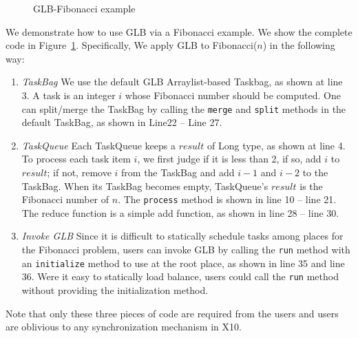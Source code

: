 \documentclass[twocolumn,DIV=20,letterpaper,9pt]{scrartcl}
\newcommand{\code}[1]{\texttt{\textup{#1}}}
\begin{document}
\begin{appendices}
\begin{figure}
  \centering
   \mbox{}
   \caption{GLB-Fibonacci example}
  \label{fig:design:fib}
\end{figure}
We demonstrate how to use GLB via a Fibonacci example. We show the complete code in Figure~\ref{fig:design:fib}. 
Specifically, We apply GLB to Fibonacci($n$) in the following way: 
\begin{enumerate}
\item \textit{TaskBag} We use the default GLB Arraylist-based Taskbag, as shown at line 3. A task is an integer $i$ whose Fibonacci number should be computed. One can split/merge the TaskBag by calling the \code{merge} and \code{split} methods in the default TaskBag, as shown in Line22 -- Line 27. 
\item \textit{TaskQueue} Each TaskQueue keeps a $result$ of Long type, as shown at line 4.  To process each task item $i$, we first judge if it is less than 2, if so, add $i$ to $result$; if not, remove $i$ from the TaskBag and add $i-1$ and $i-2$ to the TaskBag. When its TaskBag becomes empty, TaskQueue's $result$ is the Fibonacci number of $n$. The \code{process} method is shown in line 10 -- line 21. The reduce function is a simple add function, as shown in line 28  -- line 30. 
\item \textit{Invoke GLB} Since it is difficult to statically schedule tasks among places for the Fibonacci problem, users can invoke GLB by calling the \code{run} method with an \code{initialize} method to use at the root place, as shown in line 35 and line 36. Were it easy to statically load balance, users could call the \code{run} method without providing the initialization method. 
\end{enumerate} 

Note that only these three pieces of code are required from the users and users are oblivious to any synchronization mechanism in X10. 

\end{appendices}
\end{document}
